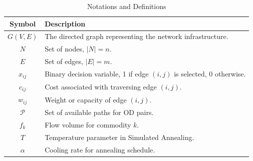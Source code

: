 \begin{table}[htbp]
\centering
\caption{Notations and Definitions}
\begin{tabular}{c|l}
\hline
\textbf{Symbol} & \textbf{Description} \\ \hline
$G(V,E)$ & The directed graph representing the network infrastructure. \\
$N$ & Set of nodes, $|N| = n$. \\
$E$ & Set of edges, $|E| = m$. \\
$x_{ij}$ & Binary decision variable, 1 if edge $(i,j)$ is selected, 0 otherwise. \\
$c_{ij}$ & Cost associated with traversing edge $(i,j)$. \\
$w_{ij}$ & Weight or capacity of edge $(i,j)$. \\
$\mathcal{P}$ & Set of available paths for OD pairs. \\
$f_k$ & Flow volume for commodity $k$. \\
$T$ & Temperature parameter in Simulated Annealing. \\
$\alpha$ & Cooling rate for annealing schedule. \\
\hline
\end{tabular}
\label{tab:notation}
\end{table}
